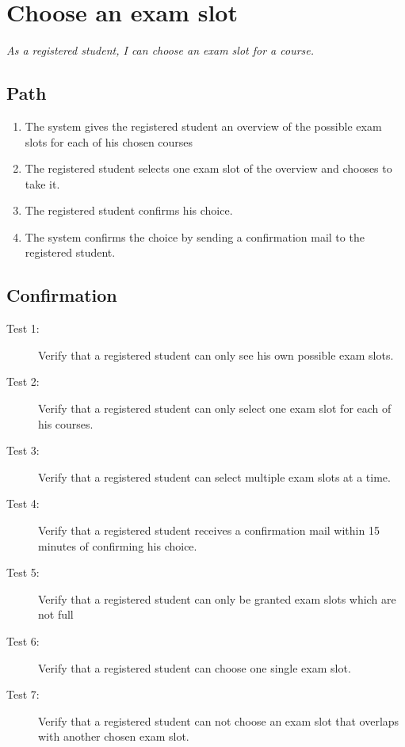 \section{Choose an exam slot}

\par \emph{As a registered student, I can choose an exam slot for a course.}

\subsection{Path}

\begin{enumerate}
  \item The system gives the registered student an overview of the possible exam
  slots for each of his chosen courses
  \item The registered student selects one exam slot of the overview and chooses
  to take it.
  \item The registered student confirms his choice.
  \item The system confirms the choice by sending a confirmation mail to the
  registered student.
\end{enumerate}

\subsection{Confirmation}

\begin{description}
\item[Test 1:] Verify that a registered student can only see his own possible
exam slots.
\item[Test 2:] Verify that a registered student can only select one exam slot
for each of his courses.
\item[Test 3:] Verify that a registered student can select multiple exam slots
at a time.
\item[Test 4:] Verify that a registered student receives a confirmation mail
within 15 minutes of confirming his choice.
\item[Test 5:] Verify that a registered student can only be granted exam slots
which are not full
\item[Test 6:] Verify that a registered student can choose one single exam slot.
\item[Test 7:] Verify that a registered student can not choose an exam slot that
overlaps with another chosen exam slot.
\end{description}